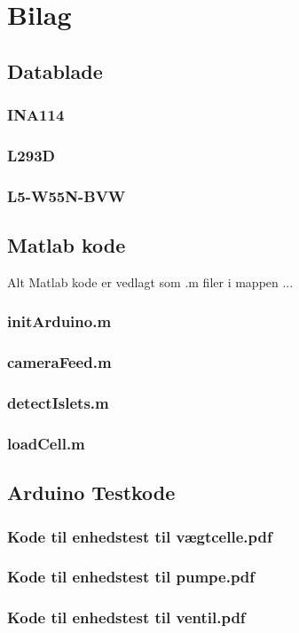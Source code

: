 \chapter{Bilag}
\section{Datablade}
\subsection{INA114}
\label{bilag:INA114}
\subsection{L293D}
\label{bilag:L293D}
\subsection{L5-W55N-BVW}
\label{bilag:L5-W55N-BVW}
\section{Matlab kode}
Alt Matlab kode er vedlagt som .m filer i mappen ... 
\subsection{initArduino.m} \label{bilag:initArduino}
\subsection{cameraFeed.m} \label{bilag:cameraFeed}
\subsection{detectIslets.m}
\subsection{loadCell.m}
\section{Arduino Testkode}
\subsection{Kode til enhedstest til vægtcelle.pdf} 
\label{bilag:TKloadcell}
\subsection{Kode til enhedstest til pumpe.pdf}
\label{bilag:TKpumpe}
\subsection{Kode til enhedstest til ventil.pdf}
\label{bilag:TKventil}
